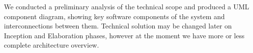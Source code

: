 
We conducted a preliminary analysis of the technical scope and produced
a UML component diagram, showing key software components of the system
and interconnections between them. Technical solution may be changed
later on Inception and Elaboration phases, however at the moment we
have more or less complete architecture overview.

